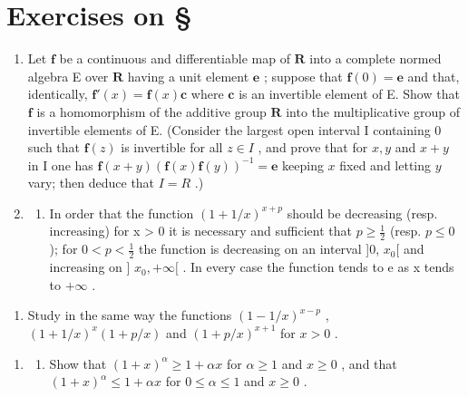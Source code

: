 \setcounter{exercisegroup}{0}
\section*{Exercises on \S{}}
{}

\begin{enumerate}
\def\labelenumi{\arabic{enumi})}
\item
  Let \(\mathbf{f}\) be a continuous and differentiable map of \(\mathbf{R}\) into a complete normed algebra E over \(\mathbf{R}\) having a unit element \(\mathbf{e}\) ; suppose that \(\mathbf{f}(0) = \mathbf{e}\) and that, identically, \(\mathbf{f}'(x) = \mathbf{f}(x)\mathbf{c}\) where \(\mathbf{c}\) is an invertible element of E. Show that \(\mathbf{f}\) is a homomorphism of the additive group \(\mathbf{R}\) into the multiplicative group of invertible elements of E. (Consider the largest open interval I containing 0 such that \(\mathbf{f}(z)\) is invertible for all \(z \in I\) , and prove that for \(x, y\) and \(x + y\) in I one has \(\mathbf{f}(x + y)(\mathbf{f}(x)\mathbf{f}(y))^{-1} = \mathbf{e}\) keeping \(x\) fixed and letting \(y\) vary; then deduce that \(I = R\) .)
\item
  \begin{enumerate}
  \def\labelenumii{\alph{enumii})}
  \tightlist
  \item
    In order that the function \((1 + 1/x)^{x+p}\) should be decreasing (resp. increasing) for x \textgreater{} 0 it is necessary and sufficient that \(p \geqslant \frac{1}{2}\) (resp. \(p \leqslant 0\) ); for \(0 < p < \frac{1}{2}\) the function is decreasing on an interval {]}0, \(x_{0}[\) and increasing on {]} \(x_{0}, +\infty[\) . In every case the function tends to e as x tends to \(+\infty\) .
  \end{enumerate}
\end{enumerate}

\begin{enumerate}
\def\labelenumi{\alph{enumi})}
\setcounter{enumi}{1}
\tightlist
\item
  Study in the same way the functions \((1 - 1 / x)^{x - p}\) , \((1 + 1 / x)^{x}(1 + p / x)\) and \((1 + p / x)^{x + 1}\) for \(x > 0\) .
\end{enumerate}

\begin{enumerate}
\def\labelenumi{\arabic{enumi})}
\setcounter{enumi}{2}
\tightlist
\item
  \begin{enumerate}
  \def\labelenumii{\alph{enumii})}
  \tightlist
  \item
    Show that \((1+x)^{\alpha} \geqslant 1 + \alpha x\) for \(\alpha \geqslant 1\) and \(x \geqslant 0\) , and that \((1+x)^{\alpha} \leqslant 1 + \alpha x\) for \(0 \leqslant \alpha \leqslant 1\) and \(x \geqslant 0\) .
  \end{enumerate}
\end{enumerate}

